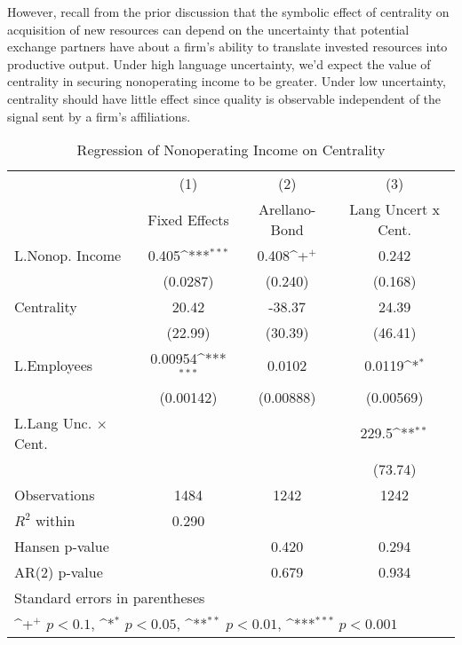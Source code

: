 However, recall from the prior discussion that the symbolic effect of centrality on acquisition of new resources can depend on the uncertainty that potential exchange partners have about a firm's ability to translate invested resources into productive output. Under high language uncertainty, we'd expect the value of centrality in securing nonoperating income to be greater. Under low uncertainty, centrality should have little effect since quality is observable independent of the signal sent by a firm's affiliations. 

\begin{table}[htbp]\centering \caption{Regression of Nonoperating Income on Centrality\label{r3}}
{
\def\sym#1{\ifmmode^{#1}\else\(^{#1}\)\fi}
\begin{tabular}{l*{3}{c}}
\hline\hline
                    &\multicolumn{1}{c}{(1)}&\multicolumn{1}{c}{(2)}&\multicolumn{1}{c}{(3)}\\
                    &\multicolumn{1}{c}{Fixed Effects}&\multicolumn{1}{c}{Arellano-Bond}&\multicolumn{1}{c}{Lang Uncert x Cent.}\\
\hline
L.Nonop. Income     &       0.405\sym{***}&       0.408\sym{+}  &       0.242         \\
                    &    (0.0287)         &     (0.240)         &     (0.168)         \\
Centrality          &       20.42         &      -38.37         &       24.39         \\
                    &     (22.99)         &     (30.39)         &     (46.41)         \\
L.Employees         &     0.00954\sym{***}&      0.0102         &      0.0119\sym{*}  \\
                    &   (0.00142)         &   (0.00888)         &   (0.00569)         \\
L.Lang Unc. $\times$ Cent.&                     &                     &       229.5\sym{**} \\
                    &                     &                     &     (73.74)         \\
\hline
Observations        &        1484         &        1242         &        1242         \\
$R^2$ within                &       0.290         &                     &                     \\
Hansen p-value             &                     &       0.420         &       0.294         \\
AR(2) p-value                &                     &       0.679         &       0.934         \\
\hline\hline
\multicolumn{4}{l}{\footnotesize Standard errors in parentheses}\\
\multicolumn{4}{l}{\footnotesize \sym{+} \(p<0.1\), \sym{*} \(p<0.05\), \sym{**} \(p<0.01\), \sym{***} \(p<0.001\)}\\
\end{tabular}
}

\end{table}

